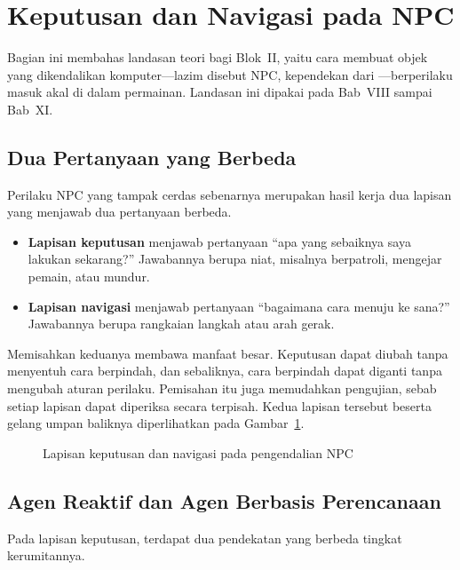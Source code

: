 \section{Keputusan dan Navigasi pada NPC}
\label{sec:keputusan-navigasi}

Bagian ini membahas landasan teori bagi Blok~II, yaitu cara membuat objek yang
dikendalikan komputer---lazim disebut NPC, kependekan dari
---berperilaku masuk akal di dalam permainan.
Landasan ini dipakai pada Bab~VIII sampai Bab~XI.

\subsection{Dua Pertanyaan yang Berbeda}

Perilaku NPC yang tampak cerdas sebenarnya merupakan hasil kerja dua lapisan
yang menjawab dua pertanyaan berbeda.

\begin{itemize}
  \item \textbf{Lapisan keputusan} menjawab pertanyaan ``apa yang sebaiknya
        saya lakukan sekarang?'' Jawabannya berupa niat, misalnya berpatroli,
        mengejar pemain, atau mundur.
  \item \textbf{Lapisan navigasi} menjawab pertanyaan ``bagaimana cara menuju
        ke sana?'' Jawabannya berupa rangkaian langkah atau arah gerak.
\end{itemize}

Memisahkan keduanya membawa manfaat besar. Keputusan dapat diubah tanpa
menyentuh cara berpindah, dan sebaliknya, cara berpindah dapat diganti tanpa
mengubah aturan perilaku. Pemisahan itu juga memudahkan pengujian, sebab
setiap lapisan dapat diperiksa secara terpisah. Kedua lapisan tersebut beserta
gelang umpan baliknya diperlihatkan pada Gambar~\ref{fig:lapisan-npc}.

\begin{figure}[htbp]
\centering

\caption{Lapisan keputusan dan navigasi pada pengendalian NPC}
\label{fig:lapisan-npc}
\end{figure}

\subsection{Agen Reaktif dan Agen Berbasis Perencanaan}

Pada lapisan keputusan, terdapat dua pendekatan yang berbeda tingkat
kerumitannya.

